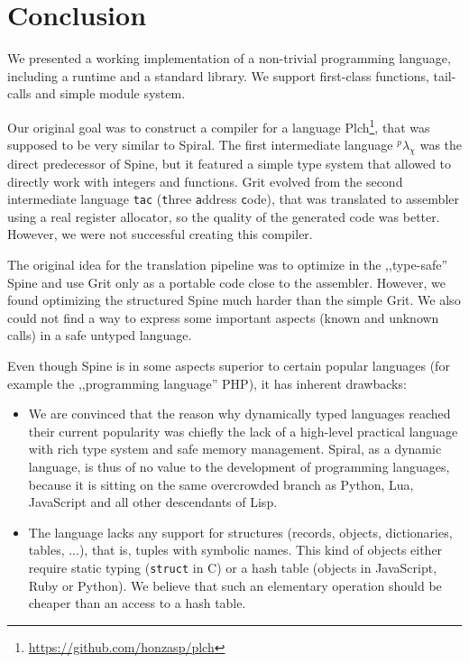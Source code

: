 \chapter{Conclusion}

We presented a working implementation of a non-trivial programming language,
including a runtime and a standard library. We support first-class functions,
tail-calls and simple module system.

Our original goal was to construct a compiler for a language
Plch\footnote{\url{https://github.com/honzasp/plch}}, that was supposed to be
very similar to Spiral. The first intermediate language $^p\lambda_\chi$ was the
direct predecessor of Spine, but it featured a simple type system that allowed
to directly work with integers and functions. Grit evolved from the second
intermediate language \texttt{tac} (\texttt{t}hree \texttt{a}ddress
\texttt{c}ode), that was translated to assembler using a real register
allocator, so the quality of the generated code was better. However, we were not
successful creating this compiler.

The original idea for the translation pipeline was to optimize in the
,,type-safe'' Spine and use Grit only as a portable code close to the assembler.
However, we found optimizing the structured Spine much harder than the simple
Grit. We also could not find a way to express some important aspects (known and
unknown calls) in a safe untyped language.

Even though Spine is in some aspects superior to certain popular languages (for
example the ,,programming language'' PHP), it has inherent drawbacks:

\begin{itemize}
  \item We are convinced that the reason why dynamically typed languages reached
    their current popularity was chiefly the lack of a high-level practical
    language with rich type system and safe memory management. Spiral, as a
    dynamic language, is thus of no value to the development of programming
    languages, because it is sitting on the same overcrowded branch as Python,
    Lua, JavaScript and all other descendants of Lisp.

  \item The language lacks any support for structures (records, objects,
    dictionaries, tables, ...), that is, tuples with symbolic names. This kind
    of objects either require static typing (\texttt{struct} in C) or a hash
    table (objects in JavaScript, Ruby or Python). We believe that such an
    elementary operation should be cheaper than an access to a hash table.
\end{itemize}

